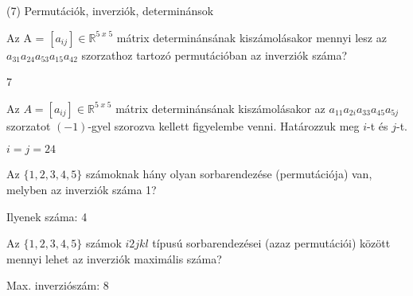 \begin{frame}[plain]
\begin{tcolorbox}[center, colback={myyellow}, coltext={black}, colframe={myyellow}]
    {\RHuge  (7) Permutációk, inverziók, determinánsok}
    \mmedskip
\end{tcolorbox}
\end{frame}

\begin{frame}
  \begin{tcolorbox}[title={7/1. {\symknight}}]
    Az A = $[a_{ij}] \in \mathbb{R}^{5 \; x \; 5}$ mátrix determinánsának kiszámolásakor mennyi lesz az $a_{31}a_{24}a_{53}a_{15}a_{42}$ szorzathoz tartozó permutációban az inverziók száma?

  \tcblower

    \mmedskip 
    
    7
  \end{tcolorbox}
\end{frame}


\begin{frame}
  \begin{tcolorbox}[title={7/2. {\symrook}}]
    Az $A = [a_{ij}] \in \mathbb{R}^{5 \; x \; 5}$ mátrix determinánsának kiszámolásakor az $a_{11}a_{2i}a_{33}a_{45}a_{5j}$ szorzatot $(-1)$-gyel szorozva kellett figyelembe venni. Határozzuk meg $i$-t és $j$-t.
  \tcblower

    \mmedskip 
    
    $i = j = 2 4$
  \end{tcolorbox}
\end{frame}


\begin{frame}
  \begin{tcolorbox}[title={7/3. {\symqueen}}]
    Az $\{1,2,3,4,5\}$ számoknak hány olyan sorbarendezése (permutációja) van, melyben az inverziók száma 1?
  \tcblower

    \mmedskip 
    
     Ilyenek száma: 4
  \end{tcolorbox}
\end{frame}


\begin{frame}
  \begin{tcolorbox}[title={7/4. {\symqueen}}]
    Az $\{1,2,3,4,5\}$ számok $i2jkl$ típusú sorbarendezései (azaz permutációi) között mennyi lehet az inverziók maximális száma?
  \tcblower

    \mmedskip 
    Max. inverziószám: 8
  \end{tcolorbox}
\end{frame}

